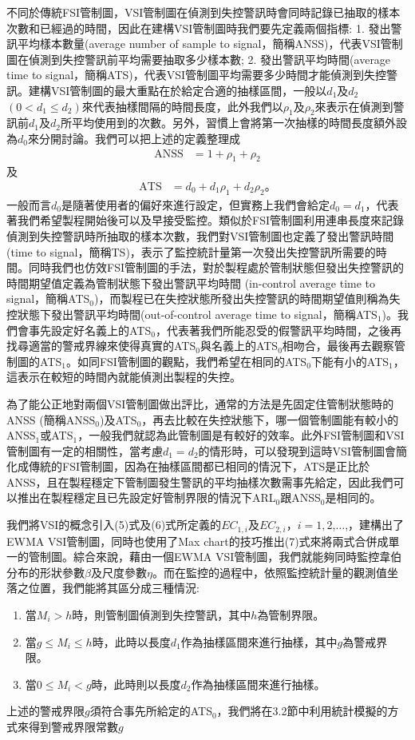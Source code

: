 \documentclass[12pt]{article}  %
\theoremstyle{plain}
\begin{document}
不同於傳統FSI管制圖，VSI管制圖在偵測到失控警訊時會同時記錄已抽取的樣本次數和已經過的時間，因此在建構VSI管制圖時我們要先定義兩個指標: 1. 發出警訊平均樣本數量(average number of sample to signal，簡稱ANSS)，代表VSI管制圖在偵測到失控警訊前平均需要抽取多少樣本數; 2. 發出警訊平均時間(average time to signal，簡稱ATS)，代表VSI管制圖平均需要多少時間才能偵測到失控警訊。建構VSI管制圖的最大重點在於給定合適的抽樣區間，一般以$d_1$及$d_2$ $(0<d_1 \leq d_2)$來代表抽樣間隔的時間長度，此外我們以$\rho_1$及$\rho_2$來表示在偵測到警訊前$d_1$及$d_2$所平均使用到的次數。另外，習慣上會將第一次抽樣的時間長度額外設為$d_0$來分開討論。我們可以把上述的定義整理成
\begin{align}
\mbox{ANSS} &=1+\rho_1+\rho_2
\end{align}
及
\begin{align}
\mbox{ATS} &=d_0+d_1 \rho_1+d_2 \rho_2 \mbox{。}
\end{align}
一般而言$d_0$是隨著使用者的偏好來進行設定，但實務上我們會給定$d_0=d_1$，代表著我們希望製程開始後可以及早接受監控。類似於FSI管制圖利用連串長度來記錄偵測到失控警訊時所抽取的樣本次數，我們對VSI管制圖也定義了發出警訊時間(time to signal，簡稱TS)，表示了監控統計量第一次發出失控警訊所需要的時間。同時我們也仿效FSI管制圖的手法，對於製程處於管制狀態但發出失控警訊的時間期望值定義為管制狀態下發出警訊平均時間 (in-control average time to signal，簡稱ATS$_0$)，而製程已在失控狀態所發出失控警訊的時間期望值則稱為失控狀態下發出警訊平均時間(out-of-control average time to signal，簡稱ATS$_1$)。我們會事先設定好名義上的ATS$_0$，代表著我們所能忍受的假警訊平均時間，之後再找尋適當的警戒界線來使得真實的ATS$_0$與名義上的ATS$_0$相吻合，最後再去觀察管制圖的ATS$_1$。如同FSI管制圖的觀點，我們希望在相同的ATS$_0$下能有小的ATS$_1$，這表示在較短的時間內就能偵測出製程的失控。

為了能公正地對兩個VSI管制圖做出評比，通常的方法是先固定住管制狀態時的ANSS (簡稱ANSS$_0$)及ATS$_0$，再去比較在失控狀態下，哪一個管制圖能有較小的ANSS$_1$或ATS$_1$，一般我們就認為此管制圖是有較好的效率。此外FSI管制圖和VSI管制圖有一定的相關性，當考慮$d_1=d_2$的情形時，可以發現到這時VSI管制圖會簡化成傳統的FSI管制圖，因為在抽樣區間都已相同的情況下，ATS是正比於ANSS，且在製程穩定下管制圖發生警訊的平均抽樣次數需事先給定，因此我們可以推出在製程穩定且已先設定好管制界限的情況下ARL$_0$跟ANSS$_0$是相同的。

我們將VSI的概念引入(5)式及(6)式所定義的$EC_{1,i}$及$EC_{2,i}$，$i=1,2$,$\ldots$,，建構出了EWMA VSI管制圖，同時也使用了Max chart的技巧推出(7)式來將兩式合併成單一的管制圖。綜合來說，藉由一個EWMA VSI管制圖，我們就能夠同時監控韋伯分布的形狀參數$\beta$及尺度參數$\eta$。而在監控的過程中，依照監控統計量的觀測值坐落之位置，我們能將其區分成三種情況:
\begin{enumerate}
\item 當$M_{i}>h$時，則管制圖偵測到失控警訊，其中$h$為管制界限。
\item 當$g \leq M_{i} \leq h$時，此時以長度$d_1$作為抽樣區間來進行抽樣，其中$g$為警戒界限。
\item 當$0 \leq M_{i}<g$時，此時則以長度$d_2$作為抽樣區間來進行抽樣。
\end{enumerate}
上述的警戒界限$g$須符合事先所給定的ATS$_0$，我們將在3.2節中利用統計模擬的方式來得到警戒界限常數$g$
\end{document}
